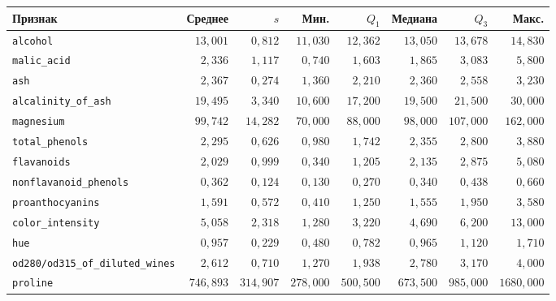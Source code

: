 \begin{tabular}{lrrrrrrr}
\toprule
Признак & Среднее & $s$ & Мин. & $Q_1$ & Медиана & $Q_3$ & Макс. \\
\midrule
\texttt{alcohol} & $13{,}001$ & $0{,}812$ & $11{,}030$ & $12{,}362$ & $13{,}050$ & $13{,}678$ & $14{,}830$ \\
\texttt{malic\_acid} & $2{,}336$ & $1{,}117$ & $0{,}740$ & $1{,}603$ & $1{,}865$ & $3{,}083$ & $5{,}800$ \\
\texttt{ash} & $2{,}367$ & $0{,}274$ & $1{,}360$ & $2{,}210$ & $2{,}360$ & $2{,}558$ & $3{,}230$ \\
\texttt{alcalinity\_of\_ash} & $19{,}495$ & $3{,}340$ & $10{,}600$ & $17{,}200$ & $19{,}500$ & $21{,}500$ & $30{,}000$ \\
\texttt{magnesium} & $99{,}742$ & $14{,}282$ & $70{,}000$ & $88{,}000$ & $98{,}000$ & $107{,}000$ & $162{,}000$ \\
\texttt{total\_phenols} & $2{,}295$ & $0{,}626$ & $0{,}980$ & $1{,}742$ & $2{,}355$ & $2{,}800$ & $3{,}880$ \\
\texttt{flavanoids} & $2{,}029$ & $0{,}999$ & $0{,}340$ & $1{,}205$ & $2{,}135$ & $2{,}875$ & $5{,}080$ \\
\texttt{nonflavanoid\_phenols} & $0{,}362$ & $0{,}124$ & $0{,}130$ & $0{,}270$ & $0{,}340$ & $0{,}438$ & $0{,}660$ \\
\texttt{proanthocyanins} & $1{,}591$ & $0{,}572$ & $0{,}410$ & $1{,}250$ & $1{,}555$ & $1{,}950$ & $3{,}580$ \\
\texttt{color\_intensity} & $5{,}058$ & $2{,}318$ & $1{,}280$ & $3{,}220$ & $4{,}690$ & $6{,}200$ & $13{,}000$ \\
\texttt{hue} & $0{,}957$ & $0{,}229$ & $0{,}480$ & $0{,}782$ & $0{,}965$ & $1{,}120$ & $1{,}710$ \\
\texttt{od280/od315\_of\_diluted\_wines} & $2{,}612$ & $0{,}710$ & $1{,}270$ & $1{,}938$ & $2{,}780$ & $3{,}170$ & $4{,}000$ \\
\texttt{proline} & $746{,}893$ & $314{,}907$ & $278{,}000$ & $500{,}500$ & $673{,}500$ & $985{,}000$ & $1680{,}000$ \\
\bottomrule
\end{tabular}
